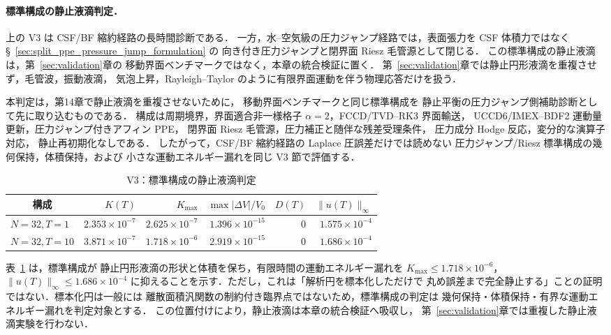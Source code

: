 \paragraph{標準構成の静止液滴判定．}
上の V3 は CSF/BF 縮約経路の長時間診断である．
一方，水--空気級の圧力ジャンプ経路では，表面張力を
CSF 体積力ではなく §~\ref{sec:split_ppe_pressure_jump_formulation} の
向き付き圧力ジャンプと閉界面 Riesz 毛管源として閉じる．
この標準構成の静止液滴は，第~\ref{sec:validation}章の
移動界面ベンチマークではなく，本章の統合検証に置く．
第~\ref{sec:validation}章では静止円形液滴を重複させず，毛管波，振動液滴，
気泡上昇，Rayleigh--Taylor のように有限界面運動を伴う物理応答だけを扱う．

本判定は，第14章で静止液滴を重複させないために，
移動界面ベンチマークと同じ標準構成を
静止平衡の圧力ジャンプ側補助診断として先に取り込むものである．
構成は周期境界，界面適合非一様格子 $\alpha=2$，FCCD/TVD--RK3 界面輸送，
UCCD6/IMEX--BDF2 運動量更新，圧力ジャンプ付きアフィン PPE，
閉界面 Riesz 毛管源，圧力補正と随伴な残差受理条件，
圧力成分 Hodge 反応，変分的な演算子対応，
静止再初期化なしである．
したがって，CSF/BF 縮約経路の Laplace 圧誤差だけでは読めない
圧力ジャンプ/Riesz 標準構成の幾何保持，体積保持，および
小さな運動エネルギー漏れを同じ V3 節で評価する．

\begin{table}[!ht]
\caption{V3：標準構成の静止液滴判定}
\label{tab:V3_production_static_droplet}
\centering\small
\begin{tabular}{l r r r r r}
\toprule
\multicolumn{1}{c}{構成} & $K(T)$ & $K_{\max}$ & $\max|\Delta V|/V_0$ & $D(T)$ & $\|u(T)\|_\infty$ \\
\midrule
$N=32,T=1$  & $2.353\times10^{-7}$ & $2.625\times10^{-7}$ & $1.396\times10^{-15}$ & $0$ & $1.575\times10^{-4}$ \\
$N=32,T=10$ & $3.871\times10^{-7}$ & $1.718\times10^{-6}$ & $2.919\times10^{-15}$ & $0$ & $1.686\times10^{-4}$ \\
\bottomrule
\end{tabular}
\end{table}

表~\ref{tab:V3_production_static_droplet} は，標準構成が
静止円形液滴の形状と体積を保ち，有限時間の運動エネルギー漏れを
$K_{\max}\le1.718\times10^{-6}$，$\|u(T)\|_\infty\le1.686\times10^{-4}$
に抑えることを示す．ただし，これは「解析円を標本化しただけで
丸め誤差まで完全静止する」ことの証明ではない．標本化円は一般には
離散面積汎関数の制約付き臨界点ではないため，標準構成の判定は
幾何保持・体積保持・有界な運動エネルギー漏れを判定対象とする．
この位置付けにより，静止液滴は本章の統合検証へ吸収し，
第~\ref{sec:validation}章では重複した静止液滴実験を行わない．

